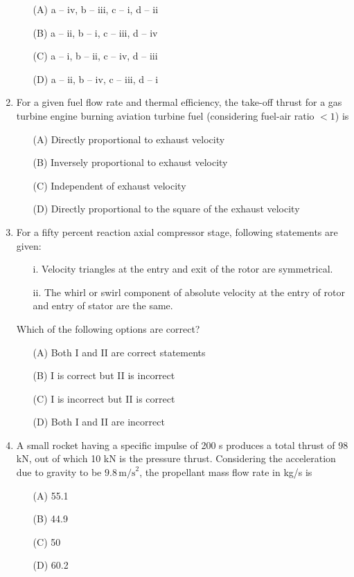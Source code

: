 \documentclass[journal]{IEEEtran}
\begin{document}
\begin{enumerate}
\begin{itemize}
    \item[(A)] a -- iv, b -- iii, c -- i, d -- ii
    \item[(B)] a -- ii, b -- i, c -- iii, d -- iv
    \item[(C)] a -- i, b -- ii, c -- iv, d -- iii
    \item[(D)] a -- ii, b -- iv, c -- iii, d -- i
\end{itemize}

\vspace{0.5cm}
\item For a given fuel flow rate and thermal efficiency, the take-off thrust for a gas turbine engine burning aviation turbine fuel (considering fuel-air ratio $<1$) is

\begin{itemize}
    \item[(A)] Directly proportional to exhaust velocity
    \item[(B)] Inversely proportional to exhaust velocity
    \item[(C)] Independent of exhaust velocity
    \item[(D)] Directly proportional to the square of the exhaust velocity
\end{itemize}
\vspace{0.5cm}
\item For a fifty percent reaction axial compressor stage, following statements are given:
\begin{enumerate}
    \item[i.] Velocity triangles at the entry and exit of the rotor are symmetrical.
    \item[ii.] The whirl or swirl component of absolute velocity at the entry of rotor and entry of stator are the same.
\end{enumerate}
Which of the following options are correct?
\begin{itemize}
    \item[(A)] Both I and II are correct statements
    \item[(B)] I is correct but II is incorrect
    \item[(C)] I is incorrect but II is correct
    \item[(D)] Both I and II are incorrect
\end{itemize}

\vspace{0.5cm}
\item A small rocket having a specific impulse of 200 s produces a total thrust of 98 kN, out of which 10 kN is the pressure thrust. Considering the acceleration due to gravity to be $9.8 \, \text{m/s}^2$, the propellant mass flow rate in kg/s is
\begin{itemize}
    \item[(A)] 55.1
    \item[(B)] 44.9
    \item[(C)] 50
    \item[(D)] 60.2
\end{itemize}


\end{enumerate}
\end{document}
